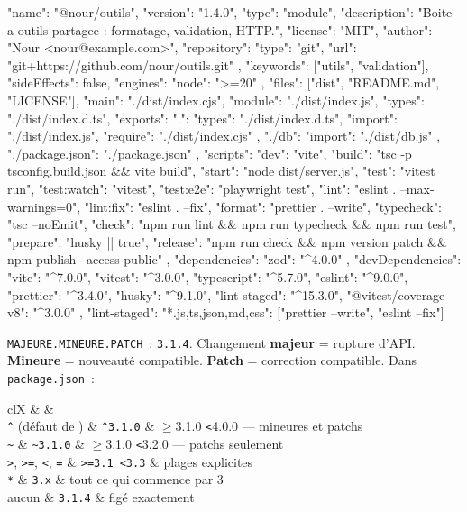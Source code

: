 \begin{codejson}
{
  "name": "@nour/outils",
  "version": "1.4.0",
  "type": "module",
  "description": "Boite a outils partagee : formatage, validation, HTTP.",
  "license": "MIT",
  "author": "Nour <nour@example.com>",
  "repository": { "type": "git", "url": "git+https://github.com/nour/outils.git" },
  "keywords": ["utils", "validation"],
  "sideEffects": false,
  "engines": { "node": ">=20" },
  "files": ["dist", "README.md", "LICENSE"],
  "main": "./dist/index.cjs",
  "module": "./dist/index.js",
  "types": "./dist/index.d.ts",
  "exports": {
    ".": { "types": "./dist/index.d.ts", "import": "./dist/index.js", "require": "./dist/index.cjs" },
    "./db": { "import": "./dist/db.js" },
    "./package.json": "./package.json"
  },
  "scripts": {
    "dev": "vite",
    "build": "tsc -p tsconfig.build.json && vite build",
    "start": "node dist/server.js",
    "test": "vitest run",
    "test:watch": "vitest",
    "test:e2e": "playwright test",
    "lint": "eslint . --max-warnings=0",
    "lint:fix": "eslint . --fix",
    "format": "prettier . --write",
    "typecheck": "tsc --noEmit",
    "check": "npm run lint && npm run typecheck && npm run test",
    "prepare": "husky || true",
    "release": "npm run check && npm version patch && npm publish --access public"
  },
  "dependencies": { "zod": "^4.0.0" },
  "devDependencies": {
    "vite": "^7.0.0", "vitest": "^3.0.0", "typescript": "^5.7.0",
    "eslint": "^9.0.0", "prettier": "^3.4.0", "husky": "^9.1.0",
    "lint-staged": "^15.3.0", "@vitest/coverage-v8": "^3.0.0"
  },
  "lint-staged": { "*.{js,ts,json,md,css}": ["prettier --write", "eslint --fix"] }
}
\end{codejson}

\verb|MAJEURE.MINEURE.PATCH|~: \verb|3.1.4|. Changement \textbf{majeur} = rupture d'API.
\textbf{Mineure} = nouveaut\'e compatible. \textbf{Patch} = correction compatible.
Dans \texttt{package.json}~:

\begin{tabz}{clX}
  \headrow {} \&  \&  \\
  \midrule
  \verb|^| (d\'efaut de ) \& \verb|^3.1.0| \& $\geq$3.1.0 \verb|<|4.0.0 --- mineures et patchs \\
  \verb|~| \& \verb|~3.1.0| \& $\geq$3.1.0 \verb|<|3.2.0 --- patchs seulement \\
  \verb|>|, \verb|>=|, \verb|<|, \verb|=| \& \verb|>=3.1 <3.3| \& plages explicites \\
  \verb|*| \& \verb|3.x| \& tout ce qui commence par 3 \\
  aucun \& \verb|3.1.4| \& fig\'e exactement \\
\end{tabz}

